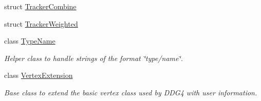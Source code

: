 \begin{DoxyCompactItemize}
struct \hyperlink{struct_d_d4hep_1_1_simulation_1_1_tracker_combine}{Tracker\+Combine}
\item 
struct \hyperlink{struct_d_d4hep_1_1_simulation_1_1_tracker_weighted}{Tracker\+Weighted}
\item 
class \hyperlink{class_d_d4hep_1_1_simulation_1_1_type_name}{Type\+Name}
\begin{DoxyCompactList}\small\item\em Helper class to handle strings of the format \char`\"{}type/name\char`\"{}. \end{DoxyCompactList}\item 
class \hyperlink{class_d_d4hep_1_1_simulation_1_1_vertex_extension}{Vertex\+Extension}
\begin{DoxyCompactList}\small\item\em Base class to extend the basic vertex class used by D\+D\+G4 with user information. \end{DoxyCompactList}\end{DoxyCompactItemize}
